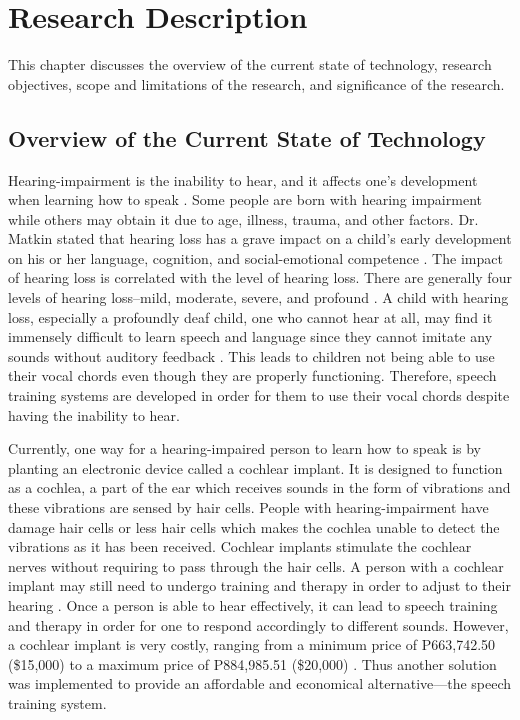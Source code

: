 \chapter{Research Description}
\label{sec:researchdesc}

This chapter discusses the overview of the current state of technology, research objectives, scope and limitations of the research, and significance of the research.

\section{Overview of the Current State of Technology}
\label{sec:overview}

Hearing-impairment is the inability to hear, and it affects one's development when learning how to speak \cite{lasak:2014:HL}. Some people are born with hearing impairment while others may obtain it due to age, illness, trauma, and other factors. Dr. Matkin stated that hearing loss has a grave impact on a child's early development on his or her language, cognition, and social-emotional competence \citeyear{matkin:1999:cechl}. The impact of hearing loss is correlated with the level of hearing loss. There are generally four levels of hearing loss--mild, moderate, severe, and profound \cite{dh:1964:lohl}. A child with hearing loss, especially a profoundly deaf child, one who cannot hear at all, may find it immensely difficult to learn speech and language since they cannot imitate any sounds without auditory feedback \cite{bernstein:1988:STA}. This leads to children not being able to use their vocal chords even though they are  properly functioning. Therefore, speech training systems are developed in order for them to use their vocal chords despite having the inability to hear.

Currently, one way for a hearing-impaired person to learn how to speak is by planting an electronic device called a cochlear implant. It is designed to function as a cochlea, a part of the ear which receives sounds in the form of vibrations and these vibrations are sensed by hair cells. People with hearing-impairment have damage hair cells or less hair cells which makes the cochlea unable to detect the vibrations as it has been received. Cochlear implants stimulate the cochlear nerves without requiring to pass through the hair cells. A person with a cochlear implant may still need to undergo training and therapy in order to adjust to their hearing \cite{blume:2009:AE}. Once a person is able to hear effectively, it can lead to speech training and therapy in order for one to respond accordingly to different sounds. However, a cochlear implant is very costly, ranging from a minimum price of P663,742.50 (\$15,000) to a maximum price of P884,985.51 (\$20,000) \cite{garcia:2015:dtfd}. Thus another solution was implemented to provide an affordable and economical alternative---the speech training system. 

